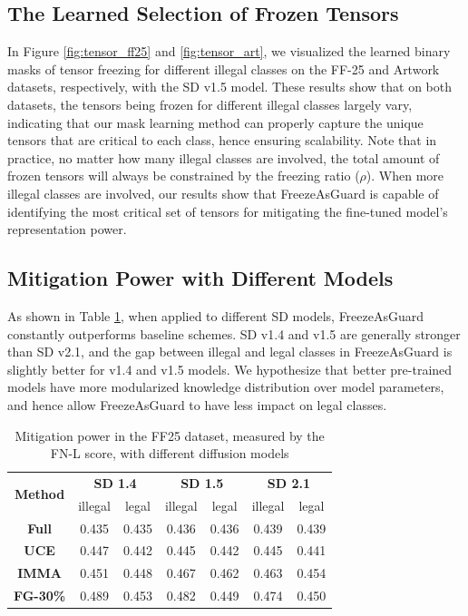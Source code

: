 \documentclass{article}
\begin{document}
\subsection{The Learned Selection of Frozen Tensors}
In Figure \ref{fig:tensor_ff25} and \ref{fig:tensor_art}, we visualized the learned binary masks of tensor freezing for different illegal classes on the FF-25 and Artwork datasets, respectively, with the SD v1.5 model. These results show that on both datasets, the tensors being frozen for different illegal classes largely vary, indicating that our mask learning method can properly capture the unique tensors that are critical to each class, hence ensuring scalability. Note that in practice, no matter how many illegal classes are involved, the total amount of frozen tensors will always be constrained by the freezing ratio ($\rho$). When more illegal classes are involved, our results show that FreezeAsGuard is capable of identifying the most critical set of tensors for mitigating the fine-tuned model's representation power.


\subsection{Mitigation Power with Different Models}
As shown in Table \ref{tab:ff25_models}, when applied to different SD models, FreezeAsGuard constantly outperforms baseline schemes. SD v1.4 and v1.5 are generally stronger than SD v2.1, and the gap between illegal and legal classes in FreezeAsGuard is slightly better for v1.4 and v1.5 models. We hypothesize that better pre-trained models have more modularized knowledge distribution over model parameters, and hence allow FreezeAsGuard to have less impact on legal classes.



\begin{table}[ht]
	\centering
	\vspace{-0.05in}
	{\fontsize{9}{9}\selectfont
		\begin{tabular}{ccccccc}
			\toprule
			\multirow{2}{*}{\textbf{Method}} & \multicolumn{2}{c}{\textbf{SD 1.4}} & \multicolumn{2}{c}{\textbf{SD 1.5}} & \multicolumn{2}{c}{\textbf{SD 2.1}}\\
			\cmidrule(ll){2-7}
			& illegal &legal& illegal &legal& illegal &legal\\
			\midrule[1pt]
			\textbf{Full} &0.435&0.435&0.436&0.436&0.439&0.439\\ \midrule
			\textbf{UCE} &0.447&0.442&0.445&0.442&0.445&0.441\\ \midrule
			\textbf{IMMA} &0.451&0.448&0.467&0.462&0.463&0.454\\ \midrule
			\textbf{FG-30\%} &0.489&0.453&0.482&0.449&0.474&0.450\\
			\bottomrule
	\end{tabular}}
	\vspace{0.1in}
	\caption{Mitigation power in the FF25 dataset, measured by the FN-L score, with different diffusion models}
	\vspace{-0.15in}
	\label{tab:ff25_models}
\end{table}
\vspace{-0.05in}
\end{document}
